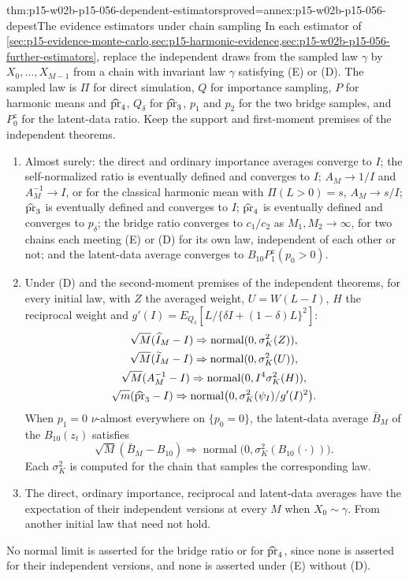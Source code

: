 \begin{hbtheorem}{thm:p15-w02b-p15-056-dependent-estimators}{proved=annex:p15-w02b-p15-056-depest}{The evidence estimators under chain sampling}
In each estimator of
\cref{sec:p15-evidence-monte-carlo,sec:p15-harmonic-evidence,sec:p15-w02b-p15-056-further-estimators},
replace the independent draws from the sampled law \(\gamma\) by
\(X_0,\ldots,X_{M-1}\) from a chain with invariant law \(\gamma\)
satisfying (E) or (D). The sampled law is \(\Pi\) for direct simulation,
\(Q\) for importance sampling, \(P\) for harmonic means and
\(\widehat{\rm pr}_4\), \(Q_\delta\) for \(\widehat{\rm pr}_3\),
\(p_1\) and \(p_2\) for the two bridge samples, and \(P^z_0\) for the
latent-data ratio. Keep the support and first-moment premises of the
independent theorems.
\begin{enumerate}
\item Almost surely: the direct and ordinary importance averages converge
to \(I\); the self-normalized ratio is eventually defined and converges to
\(I\); \(A_M\to1/I\) and \(A_M^{-1}\to I\), or for the classical harmonic
mean with \(\Pi(L>0)=s\), \(A_M\to s/I\); \(\widehat{\rm pr}_3\) is
eventually defined and converges to \(I\); \(\widehat{\rm pr}_4\) is
eventually defined and converges to \(p_\delta\); the bridge ratio converges to \(c_1/c_2\) as
\(M_1,M_2\to\infty\), for two chains each meeting (E) or (D) for its own
law, independent of each other or not; and the latent-data average
converges to \(B_{10}P^z_1(p_0>0)\).
\item Under (D) and the second-moment premises of the independent
theorems, for every initial law, with \(Z\) the averaged weight,
\(U=W(L-I)\), \(H\) the reciprocal weight and
\(g'(I)=E_{Q_\delta}[L/\{\delta I+(1-\delta)L\}^2]\):
\[
\begin{gathered}
 \sqrt M(\widehat I_M-I)\Rightarrow\operatorname{normal}(0,\sigma^2_K(Z)),\\
 \sqrt M(\widetilde I_M-I)\Rightarrow\operatorname{normal}(0,\sigma^2_K(U)),\\
 \sqrt M(A_M^{-1}-I)\Rightarrow\operatorname{normal}(0,I^4\sigma^2_K(H)),\\
 \sqrt m(\widehat{\rm pr}_3-I)\Rightarrow
 \operatorname{normal}\bigl(0,\sigma^2_K(\psi_I)/g'(I)^2\bigr).
\end{gathered}
\]
When \(p_1=0\) \(\nu\)-almost everywhere on \(\{p_0=0\}\), the
latent-data average \(\bar B_M\) of the \(B_{10}(z_t)\) satisfies
\[
 \sqrt M(\bar B_M-B_{10})\Rightarrow
 \operatorname{normal}\bigl(0,\sigma^2_K(B_{10}(\cdot))\bigr).
\]
Each \(\sigma^2_K\) is computed for the chain that samples the
corresponding law.
\item The direct, ordinary importance, reciprocal and latent-data averages
have the expectation of their independent versions at every \(M\) when
\(X_0\sim\gamma\). From another initial law that need not hold.
\end{enumerate}
No normal limit is asserted for the bridge ratio or for
\(\widehat{\rm pr}_4\), since none is asserted for their independent
versions, and none is asserted under (E) without (D).
\end{hbtheorem}

